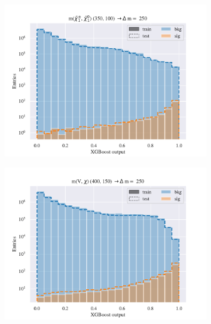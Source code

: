 \begin{figure}[H]
\begin{subfigure}[t!]{0.49\textwidth}
        \includegraphics[width = \textwidth]{Figures/WW/BDT/Low_level/Inter/scaled_train_test_395320.pdf}
        \caption{}
        \label{fig:traintestscaled}
    \end{subfigure}
    \begin{subfigure}[t!]{0.49\textwidth}
        \includegraphics[width = \textwidth]{Figures/Mono_Z/ML/BDT/Low_level/Inter/scaled_train_test_310613.pdf}
        \caption{}
        \label{fig:ROCBDTLow_low_level}
    \end{subfigure}
    \caption{}
    \label{fig:resExample}
\end{figure}

